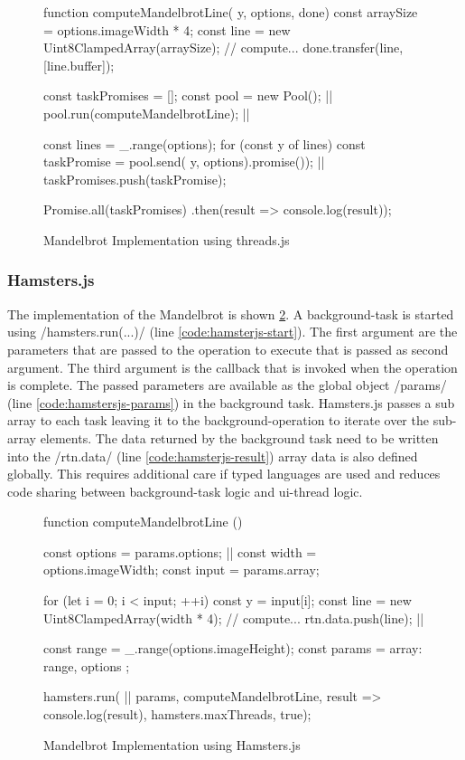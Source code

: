 \begin{figure}
	\begin{javascriptcode}
function computeMandelbrotLine({ y, options}, done) {
	const arraySize = options.imageWidth * 4;
    const line = new Uint8ClampedArray(arraySize);
    // compute...
    done.transfer(line, [line.buffer]);
}

const taskPromises = [];
const pool = new Pool(); |$\label{code:threadsjs-pool}$|
pool.run(computeMandelbrotLine); |$\label{code:threadsjs-worker}$|

const lines = _.range(options);
for (const y of lines) {
	const taskPromise = pool.send({ y, options}).promise()); |$\label{code:threadsjs-messaging}$|
	taskPromises.push(taskPromise);
}

Promise.all(taskPromises)
	.then(result => console.log(result));	
\end{javascriptcode}
\caption{Mandelbrot Implementation using threads.js}
\label{fig:mandelbrot-threadsjs}
\end{figure}

\subsubsection{Hamsters.js}
The implementation of the Mandelbrot is shown \cref{fig:mandelbrot-hamsterjs}. A background-task is started using \javascriptinline/hamsters.run(...)/ (line \ref{code:hamsterjs-start}). The first argument are the parameters that are passed to the operation to execute that is passed as second argument. The third argument is the callback that is invoked when the operation is complete. The passed parameters are available as the global object \javascriptinline/params/ (line \ref{code:hamstersjs-params}) in the background task. Hamsters.js passes a sub array to each task leaving it to the background-operation to iterate over the sub-array elements. The data returned by the background task need to be written into the \javascriptinline/rtn.data/ (line \ref{code:hamsterjs-result}) array data is also defined globally. This requires additional care if typed languages are used and reduces code sharing between background-task logic and ui-thread logic.

\begin{figure}
\begin{javascriptcode}
function computeMandelbrotLine () {
	const options = params.options; |$\label{code:hamstersjs-params}$|
	const width = options.imageWidth;
	const input = params.array;

	for (let i = 0; i < input; ++i) {
		const y = input[i];
		const line = new Uint8ClampedArray(width * 4);
		// compute...
		rtn.data.push(line); |$\label{code:hamsterjs-result}$|
	}
}

const range = _.range(options.imageHeight);
const params = {
	array: range,
	options
};

hamsters.run( |$\label{code:hamsterjs-start}$|
	params,  
	computeMandelbrotLine, 
	result => console.log(result), 
	hamsters.maxThreads, 
	true);
\end{javascriptcode}
\caption{Mandelbrot Implementation using Hamsters.js}
\label{fig:mandelbrot-hamsterjs}
\end{figure}

